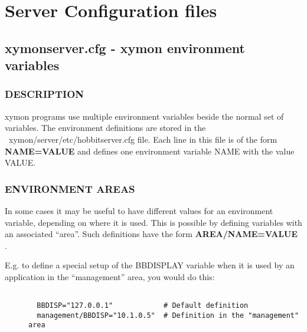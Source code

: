 %
\chapter{Server Configuration files}

%

\section{ xymonserver.cfg - xymon environment variables }
 
\subsection{DESCRIPTION}
 xymon programs use multiple environment variables beside the normal set of variables. The environment definitions are stored in the ~xymon/server/etc/hobbitserver.cfg file. Each line in this file is of the form \textbf{NAME=VALUE}
 and defines one environment variable NAME with the value VALUE. 

 
\subsection{ENVIRONMENT AREAS}
 In some cases it may be useful to have different values for an environment variable, depending on where it is used. This is possible by defining variables with an associated ``area''. Such definitions have the form \textbf{AREA/NAME=VALUE}
. 

  E.g. to define a special setup of the BBDISPLAY variable when it is used by an application in the ``management'' area, you would do this: \begin{description}
\item[]\begin{verbatim}

  BBDISP="127.0.0.1"            # Default definition
  management/BBDISP="10.1.0.5"  # Definition in the "management" area

\end{verbatim}


\end{description}



